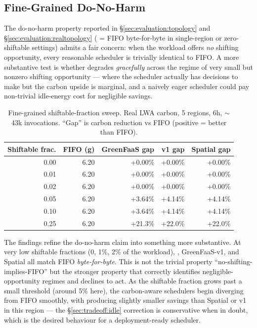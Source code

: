 \subsection{Fine-Grained Do-No-Harm}
\label{sec:evaluation:fine-donoharm}

The do-no-harm property reported in
\S\ref{sec:evaluation:topology} and
\S\ref{sec:evaluation:realtopology} (\GreenFaaS{} = FIFO byte-for-byte
in single-region or zero-shiftable settings) admits a fair concern:
when the workload offers \emph{no} shifting opportunity, every
reasonable scheduler is trivially identical to FIFO. A more
substantive test is whether \GreenFaaS{} degrades \emph{gracefully}
across the regime of very small but nonzero shifting opportunity ---
where the scheduler actually has decisions to make but the carbon
upside is marginal, and a naively eager scheduler could pay
non-trivial idle-energy cost for negligible savings.

\begin{table}[h]
\centering\small
\caption{Fine-grained shiftable-fraction sweep. Real LWA carbon,
5 regions, 6h, $\sim$43k invocations. ``Gap'' is carbon reduction vs
FIFO (positive = better than FIFO).}
\label{tab:fine-donoharm}
\begin{tabular}{rrrrr}
\toprule
Shiftable frac. & FIFO (g) & GreenFaaS gap & v1 gap & Spatial gap \\
\midrule
0.00          & 6.20 & +0.00\%  & +0.00\%  & +0.00\%  \\
0.01          & 6.20 & +0.00\%  & +0.00\%  & +0.00\%  \\
0.02          & 6.20 & +0.00\%  & +0.00\%  & +0.00\%  \\
0.05          & 6.20 & +3.64\%  & +4.14\%  & +4.14\%  \\
0.10          & 6.20 & +3.64\%  & +4.14\%  & +4.14\%  \\
0.25          & 6.20 & +21.3\%  & +22.0\%  & +22.0\%  \\
\bottomrule
\end{tabular}
\end{table}

The findings refine the do-no-harm claim into something more
substantive. At very low shiftable fractions (0, 1\%, 2\% of the
workload), \GreenFaaS{}, GreenFaaS-v1, and Spatial all match FIFO
\emph{byte-for-byte}. This is not the trivial property
``no-shifting-implies-FIFO'' but the stronger property that
\GreenFaaS{} correctly identifies negligible-opportunity regimes and
declines to act. As the shiftable fraction grows past a small
threshold (around 5\% here), the carbon-aware schedulers begin
diverging from FIFO smoothly, with \GreenFaaS{} producing slightly
smaller savings than Spatial or v1 in this region --- the
\S\ref{sec:tradeoff:idle} correction is conservative when in doubt,
which is the desired behaviour for a deployment-ready scheduler.

